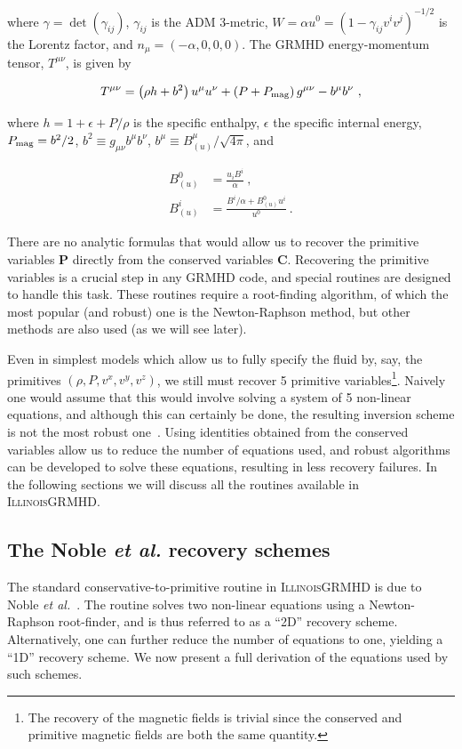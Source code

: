 \documentclass{article}
\newcommand{\igm}{\textsc{IllinoisGRMHD}\xspace}
\newcommand{\primv}{\bm{P}}
\newcommand{\consv}{\bm{C}}
\newcommand{\etal}{\textit{et al.}\xspace}
\newcommand{\eq}[1]{
\begin{equation}
    #1
\end{equation}
}
\newcommand{\al}[1] {
\begin{align}
    #1
\end{align}
}
\begin{document}
\noindent where $\gamma=\det\left(\gamma_{ij}\right)$, $\gamma_{ij}$ is the ADM 3-metric, $W=\alpha u^{0} = \left(1-\gamma_{ij}v^{i}v^{j}\right)^{-1/2}$ is the Lorentz factor, and $n_{\mu}=\left(-\alpha,0,0,0\right)$. The GRMHD energy-momentum tensor, $T^{\mu\nu}$, is given by

\eq{
T^{\mu\nu} = \left(\rho h + b^{2}\right)u^{\mu}u^{\nu} + \left(P + P_{\rm mag}\right) g^{\mu\nu} - b^{\mu}b^{\nu}\ ,
}

\noindent where $h = 1 + \epsilon + P/\rho$ is the specific enthalpy, $\epsilon$ the specific internal energy, $P_{\rm mag} = b^{2}/2$, $b^{2} \equiv g_{\mu\nu}b^{\mu}b^{\nu}$, $b^{\mu} \equiv B^{\mu}_{(u)}/\sqrt{4\pi}$, and

\al{
B^{0}_{(u)} &= \frac{u_{i}B^{i}}{\alpha}\ ,\label{eq:B0u}\\
B^{i}_{(u)} &= \frac{B^{i}/\alpha + B^{0}_{(u)}u^{i}}{u^{0}}\label{eq:Biu}\ .
}

There are no analytic formulas that would allow us to recover the primitive variables $\primv$ directly from the conserved variables $\consv$. Recovering the primitive variables is a crucial step in any GRMHD code, and special routines are designed to handle this task. These routines require a root-finding algorithm, of which the most popular (and robust) one is the Newton-Raphson method, but other methods are also used (as we will see later).

Even in simplest models which allow us to fully specify the fluid by, say, the primitives $\left(\rho,P,v^{x},v^{y},v^{z}\right)$, we still must  recover 5 primitive variables\footnote{The recovery of the magnetic fields is trivial since the conserved and primitive magnetic fields are both the same quantity.}. Naively one would assume that this would involve solving a system of 5 non-linear equations, and although this can certainly be done, the resulting inversion scheme is not the most robust one~\cite{noble2006primitive}. Using identities obtained from the conserved variables allow us to reduce the number of equations used, and robust algorithms can be developed to solve these equations, resulting in less recovery failures. In the following sections we will discuss all the routines available in \igm.

\subsection{The Noble \etal recovery schemes}

The standard conservative-to-primitive routine in \igm is due to Noble \etal~\cite{noble2006primitive}. The routine solves two non-linear equations using a Newton-Raphson root-finder, and is thus referred to as a ``2D'' recovery scheme. Alternatively, one can further reduce the number of equations to one, yielding a ``1D'' recovery scheme. We now present a full derivation of the equations used by such schemes.
\end{document}
